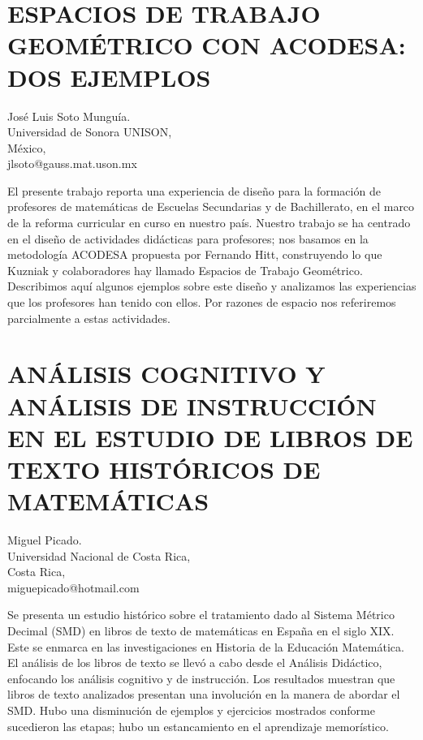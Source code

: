 \section{ESPACIOS DE TRABAJO GEOMÉTRICO CON ACODESA: DOS EJEMPLOS}

\begin{datos}
José Luis Soto Munguía. \\
 Universidad de Sonora UNISON, \\
\hfill México, \\
\hfill jlsoto@gauss.mat.uson.mx
\end{datos}

El presente trabajo reporta una experiencia de diseño para la formación
de profesores de matemáticas de Escuelas Secundarias y de Bachillerato,
en el marco de la reforma curricular en curso en nuestro país. Nuestro
trabajo se ha centrado en el diseño de actividades didácticas para
profesores; nos basamos en la metodología ACODESA propuesta por Fernando
Hitt, construyendo lo que Kuzniak y colaboradores hay llamado Espacios
de Trabajo Geométrico. Describimos aquí algunos ejemplos sobre este
diseño y analizamos las experiencias que los profesores han tenido
con ellos. Por razones de espacio nos referiremos parcialmente a estas
actividades. 


\section{ANÁLISIS COGNITIVO Y ANÁLISIS DE INSTRUCCIÓN EN EL ESTUDIO DE LIBROS
DE TEXTO HISTÓRICOS DE MATEMÁTICAS}

\begin{datos}
Miguel Picado. \\
Universidad Nacional de Costa Rica, \\
\hfill Costa Rica, \\
\hfill miguepicado@hotmail.com
\end{datos}

Se presenta un estudio histórico sobre el tratamiento dado al Sistema
Métrico Decimal (SMD) en libros de texto de matemáticas en España
en el siglo XIX. Este se enmarca en las investigaciones en Historia
de la Educación Matemática. El análisis de los libros de texto se
llevó a cabo desde el Análisis Didáctico, enfocando los análisis cognitivo
y de instrucción. Los resultados muestran que libros de texto analizados
presentan una involución en la manera de abordar el SMD. Hubo una
disminución de ejemplos y ejercicios mostrados conforme sucedieron
las etapas; hubo un estancamiento en el aprendizaje memorístico.


